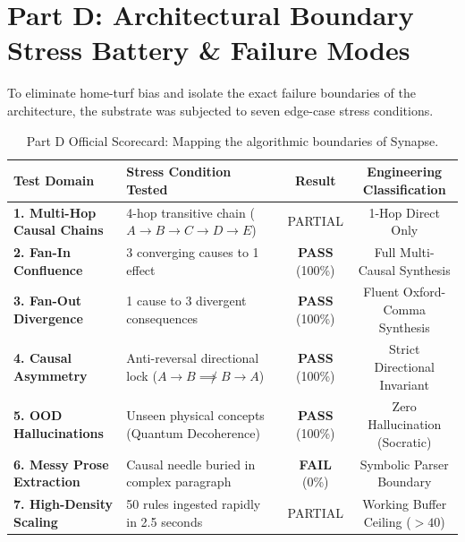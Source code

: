 \documentclass[11pt,a4paper]{article}
\begin{document}
\section{Part D: Architectural Boundary Stress Battery \& Failure Modes}
To eliminate home-turf bias and isolate the exact failure boundaries of the architecture, the substrate was subjected to seven edge-case stress conditions.

\begin{table}[H]
\centering
\small\sffamily
\setlength{\tabcolsep}{4.5pt}
\begin{tabularx}{\textwidth}{l X cc}
\toprule
\textbf{\color{brandnavy}Test Domain} & \textbf{\color{brandnavy}Stress Condition Tested} & \textbf{\color{brandnavy}Result} & \textbf{\color{brandnavy}Engineering Classification} \\
\midrule
\textbf{1. Multi-Hop Causal Chains} & 4-hop transitive chain ($A \to B \to C \to D \to E$) & PARTIAL & 1-Hop Direct Only \\
\textbf{2. Fan-In Confluence} & 3 converging causes to 1 effect & \textbf{PASS} (100\%) & Full Multi-Causal Synthesis \\
\textbf{3. Fan-Out Divergence} & 1 cause to 3 divergent consequences & \textbf{PASS} (100\%) & Fluent Oxford-Comma Synthesis \\
\textbf{4. Causal Asymmetry} & Anti-reversal directional lock ($A \to B \not\implies B \to A$) & \textbf{PASS} (100\%) & Strict Directional Invariant \\
\textbf{5. OOD Hallucinations} & Unseen physical concepts (Quantum Decoherence) & \textbf{PASS} (100\%) & Zero Hallucination (Socratic) \\
\textbf{6. Messy Prose Extraction} & Causal needle buried in complex paragraph & \textbf{FAIL} (0\%) & Symbolic Parser Boundary \\
\textbf{7. High-Density Scaling} & 50 rules ingested rapidly in 2.5 seconds & PARTIAL & Working Buffer Ceiling ($>40$) \\
\bottomrule
\end{tabularx}
\caption{Part D Official Scorecard: Mapping the algorithmic boundaries of Synapse.}
\end{table}
\end{document}
